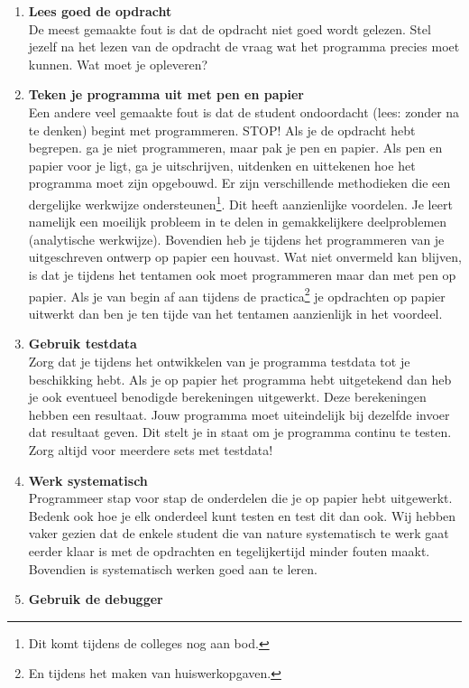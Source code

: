 \documentclass[a4paper,10pt,fleqn,twoside]{article}
\begin{document}
\begin{enumerate}[label=\textbf{\arabic*.}]
\item \textbf{Lees goed de opdracht}\\
De meest gemaakte fout is dat de opdracht niet goed wordt gelezen. Stel jezelf na het lezen van de opdracht de vraag wat het programma precies moet kunnen. Wat moet je opleveren? 
\item \textbf{Teken je programma uit met pen en papier}\\
Een andere veel gemaakte fout is dat de student ondoordacht (lees: zonder na te denken) begint met programmeren. STOP! Als je de opdracht hebt begrepen. ga je niet programmeren, maar pak je pen en papier. Als pen en papier voor je ligt, ga je uitschrijven, uitdenken en uittekenen hoe het programma moet zijn opgebouwd. Er zijn verschillende methodieken die een dergelijke werkwijze ondersteunen\footnote{Dit komt tijdens de colleges nog aan bod.}. Dit heeft aanzienlijke voordelen. Je leert namelijk een moeilijk probleem in te delen in gemakkelijkere deelproblemen (analytische werkwijze). Bovendien heb je tijdens het programmeren van je uitgeschreven ontwerp op papier een houvast. Wat niet onvermeld kan blijven, is dat je tijdens het tentamen ook moet programmeren maar dan met pen op papier. Als je van begin af aan tijdens de practica\footnote{En tijdens het maken van huiswerkopgaven.} je opdrachten op papier uitwerkt dan ben je ten tijde van het tentamen aanzienlijk in het voordeel.
\item \textbf{Gebruik testdata}\\
Zorg dat je tijdens het ontwikkelen van je programma testdata tot je beschikking hebt. Als je op papier het programma hebt uitgetekend dan heb je ook eventueel benodigde berekeningen uitgewerkt. Deze berekeningen hebben een resultaat. Jouw programma moet uiteindelijk bij dezelfde invoer dat resultaat geven. Dit stelt je in staat om je programma continu te testen. Zorg altijd voor meerdere sets met testdata!
\item \textbf{Werk systematisch}\\
Programmeer stap voor stap de onderdelen die je op papier hebt uitgewerkt. Bedenk ook hoe je elk onderdeel kunt testen en test dit dan ook. Wij hebben vaker gezien dat de enkele student die van nature systematisch te werk gaat eerder klaar is met de opdrachten en tegelijkertijd minder fouten maakt. Bovendien is systematisch werken goed aan te leren.
\item \textbf{Gebruik de debugger}\\

\end{enumerate}
\end{document}

